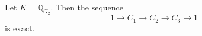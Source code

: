 Let $K = \mathbb{Q}_{G_2}$. Then the sequence
$$1 \rightarrow C_1 \rightarrow C_2 \rightarrow C_3 \rightarrow 1$$
is exact.
